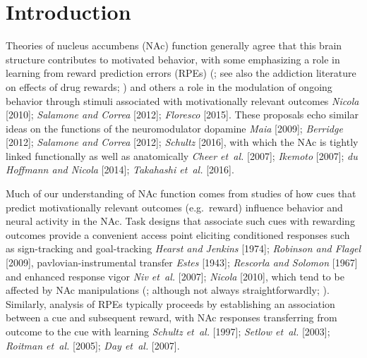 \documentclass[11pt]{article}
\let\citeNP=\citealt
\newcommand{\ldiffentity}[1]{#1}
\begin{document}
\newpage

\section*{Introduction}

Theories of nucleus accumbens (NAc) function generally agree that this
brain structure contributes to motivated behavior, with some
emphasizing a role in learning from reward prediction errors (RPEs) (\citeNP{Joel2002,Maia2009,Khamassi2012,Lee2012,Schultz2016,Averbeck2017}; see
  also the addiction literature on effects of drug
  rewards; \citeNP{Kalivas2005,Hyman2006,Carelli2009}) and others a role in
the modulation of ongoing behavior through stimuli associated with
motivationally relevant outcomes \ldiffentity{\textit{Nicola} [\ldiffentity{2010}]}; \ldiffentity{\textit{Salamone and Correa} [\ldiffentity{2012}]}; \ldiffentity{\textit{Floresco} [\ldiffentity{2015}]}. These
proposals echo similar ideas on the functions of the neuromodulator
dopamine \ldiffentity{\textit{Maia} [\ldiffentity{2009}]}; \ldiffentity{\textit{Berridge} [\ldiffentity{2012}]}; \ldiffentity{\textit{Salamone and Correa} [\ldiffentity{2012}]}; \ldiffentity{\textit{Schultz} [\ldiffentity{2016}]}, with
which the NAc is tightly linked functionally as well as anatomically
\ldiffentity{\textit{Cheer et~al.} [\ldiffentity{2007}]}; \ldiffentity{\textit{Ikemoto} [\ldiffentity{2007}]}; \ldiffentity{\textit{du Hoffmann and Nicola} [\ldiffentity{2014}]}; \ldiffentity{\textit{Takahashi et~al.} [\ldiffentity{2016}]}.

Much of our understanding of NAc function comes from studies of how
cues that predict motivationally relevant outcomes (e.g.\ reward)
influence behavior and neural activity in the NAc. Task designs that
associate such cues with rewarding outcomes provide a convenient
access point eliciting conditioned responses such as sign-tracking and
goal-tracking \ldiffentity{\textit{Hearst and Jenkins} [\ldiffentity{1974}]}; \ldiffentity{\textit{Robinson and Flagel} [\ldiffentity{2009}]},
pavlovian-instrumental transfer \ldiffentity{\textit{Estes} [\ldiffentity{1943}]}; \ldiffentity{\textit{Rescorla and Solomon} [\ldiffentity{1967}]} and
enhanced response vigor \ldiffentity{\textit{Niv et~al.} [\ldiffentity{2007}]}; \ldiffentity{\textit{Nicola} [\ldiffentity{2010}]}, which tend to be
affected by NAc manipulations (\citeNP{Corbit2011,Flagel2011,Chang2012};
although not always
  straightforwardly; \citeNP{Giertler2004,Chang2013}). Similarly, analysis
of RPEs typically proceeds by establishing an association between a
cue and subsequent reward, with NAc responses transferring from
outcome to the cue with learning
\ldiffentity{\textit{Schultz et~al.} [\ldiffentity{1997}]}; \ldiffentity{\textit{Setlow et~al.} [\ldiffentity{2003}]}; \ldiffentity{\textit{Roitman et~al.} [\ldiffentity{2005}]}; \ldiffentity{\textit{Day et~al.} [\ldiffentity{2007}]}.
\end{document}
